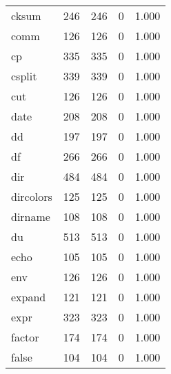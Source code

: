\begin{longtable}{lp{3.0cm}p{3.0cm}p{3.0cm}p{3.0cm}}
cksum     &                     246 &              246 &                 0 &                        1.000 \\
comm      &                     126 &              126 &                 0 &                        1.000 \\
cp        &                     335 &              335 &                 0 &                        1.000 \\
csplit    &                     339 &              339 &                 0 &                        1.000 \\
cut       &                     126 &              126 &                 0 &                        1.000 \\
date      &                     208 &              208 &                 0 &                        1.000 \\
dd        &                     197 &              197 &                 0 &                        1.000 \\
df        &                     266 &              266 &                 0 &                        1.000 \\
dir       &                     484 &              484 &                 0 &                        1.000 \\
dircolors &                     125 &              125 &                 0 &                        1.000 \\
dirname   &                     108 &              108 &                 0 &                        1.000 \\
du        &                     513 &              513 &                 0 &                        1.000 \\
echo      &                     105 &              105 &                 0 &                        1.000 \\
env       &                     126 &              126 &                 0 &                        1.000 \\
expand    &                     121 &              121 &                 0 &                        1.000 \\
expr      &                     323 &              323 &                 0 &                        1.000 \\
factor    &                     174 &              174 &                 0 &                        1.000 \\
false     &                     104 &              104 &                 0 &                        1.000 \\

\end{longtable}
